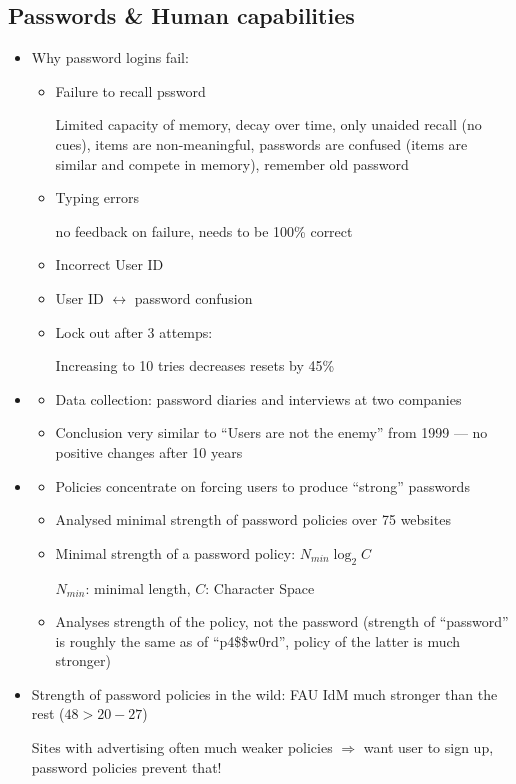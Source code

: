 \documentclass[a4paper,12pt]{scrartcl}
\begin{document}
\subsection{Passwords \& Human capabilities}
\begin{itemize}
	\item
		Why password logins fail:
		\begin{itemize}
			\item
				Failure to recall pssword

				Limited capacity of memory, decay over time, only unaided recall (no cues), items are non-meaningful, passwords are confused (items are similar and compete in memory), remember old password
			\item
				Typing errors

				no feedback on failure, needs to be 100\% correct
			\item
				Incorrect User ID
			\item
				User ID $\leftrightarrow$ password confusion
			\item
				Lock out after 3 attemps:

				Increasing to 10 tries decreases resets by 45\%
		\end{itemize}
	\item
		\begin{itemize}
			\item
				Data collection:  password diaries and interviews at two companies
			\item
				Conclusion very similar to \enquote{Users are not the enemy} from 1999 --- no positive changes after 10 years
		\end{itemize}
	\item
		\begin{itemize}
			\item
				Policies concentrate on forcing users to produce \enquote{strong} passwords
			\item
				Analysed  minimal strength of password policies over 75 websites
			\item
				Minimal strength of a password policy: $N_{min} \log_2 C$

				$N_{min}$: minimal length, $C$: Character Space
			\item
				Analyses strength of the policy, not the password (strength of \enquote{password} is roughly the same as of \enquote{p4\$\$w0rd}, policy of the latter is much stronger)
		\end{itemize}
	\item
		Strength of password policies in the wild: FAU IdM much stronger than the rest ($48 > 20-27$)

		Sites with advertising often much weaker policies $\Rightarrow$ want user to sign up, password policies prevent that!
\end{itemize}
\end{document}
